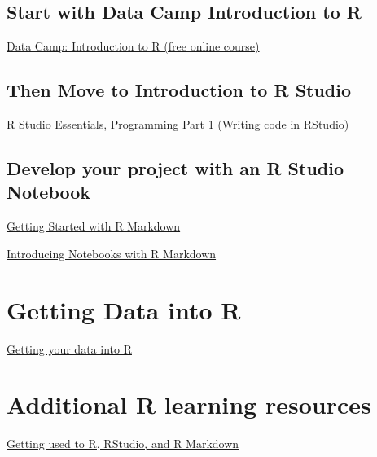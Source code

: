 \documentclass[]{book}
\begin{document}
\hypertarget{start-with-data-camp-introduction-to-r}{%
\subsection{Start with Data Camp Introduction to R}\label{start-with-data-camp-introduction-to-r}}

\href{https://www.datacamp.com/courses/free-introduction-to-r}{Data Camp: Introduction to R (free online course)}

\hypertarget{then-move-to-introduction-to-r-studio}{%
\subsection{Then Move to Introduction to R Studio}\label{then-move-to-introduction-to-r-studio}}

\href{https://www.rstudio.com/resources/webinars/rstudio-essentials-webinar-series-part-1/}{R Studio Essentials, Programming Part 1 (Writing code in RStudio)}

\hypertarget{develop-your-project-with-an-r-studio-notebook}{%
\subsection{Develop your project with an R Studio Notebook}\label{develop-your-project-with-an-r-studio-notebook}}

\href{https://www.rstudio.com/resources/webinars/getting-started-with-r-markdown/}{Getting Started with R Markdown}

\href{https://www.rstudio.com/resources/webinars/introducing-notebooks-with-r-markdown/}{Introducing Notebooks with R Markdown}

\hypertarget{getting-data-into-r}{%
\section{Getting Data into R}\label{getting-data-into-r}}

\href{https://www.rstudio.com/resources/webinars/getting-your-data-into-r/}{Getting your data into R}

\hypertarget{additional-r-learning-resources}{%
\section{Additional R learning resources}\label{additional-r-learning-resources}}

\href{https://bookdown.org/chesterismay/rbasics/}{Getting used to R, RStudio, and R Markdown}
\end{document}
